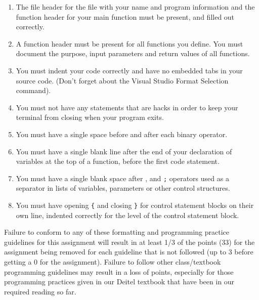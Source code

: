 \documentclass[11pt]{article}
\begin{document}
\begin{enumerate}
\item The file header for the file with your name and program information
  and the function header for your main function must be present, and
  filled out correctly.
\item A function header must be present for all functions you define.
  You must document the purpose, input parameters and return values
  of all functions.
\item You must indent your code correctly and have no embedded tabs in
  your source code. (Don't forget about the Visual Studio Format
  Selection command).
\item You must not have any statements that are hacks in order to keep
  your terminal from closing when your program exits.
\item You must have a single space before and after each binary operator.
\item You must have a single blank line after the end of your declaration
  of variables at the top of a function, before the first code
  statement.
\item You must have a single blank space after , and \verb~;~ operators used as a
  separator in lists of variables, parameters or other control
  structures.
\item You must have opening \verb~{~ and closing \verb~}~ for control statement blocks
  on their own line, indented correctly for the level of the control
  statement block.
\end{enumerate}

Failure to conform to any of these formatting and programming practice
guidelines for this assignment will result in at least 1/3 of the
points (33) for the assignment being removed for each guideline that
is not followed (up to 3 before getting a 0 for the
assignment). Failure to follow other class/textbook programming
guidelines may result in a loss of points, especially for those
programming practices given in our Deitel textbook that have been in
our required reading so far.
\end{document}
